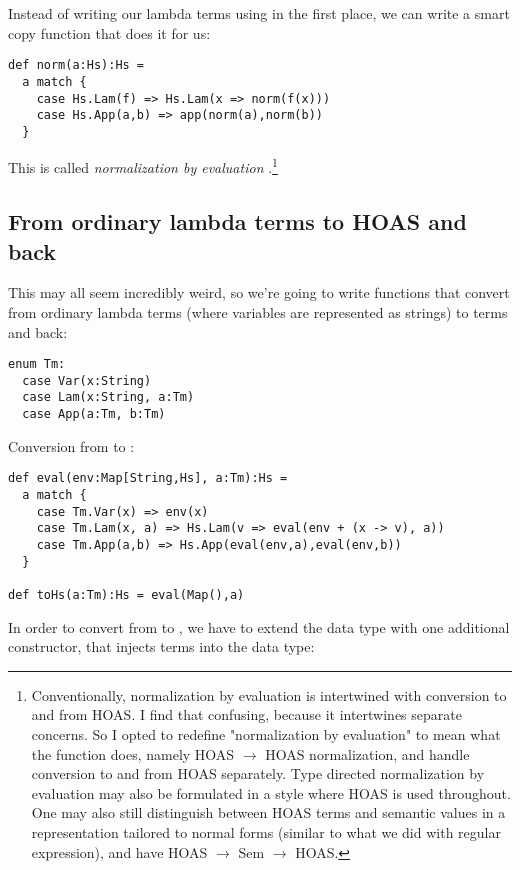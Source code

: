 Instead of writing our lambda terms using  in the first place, we can write a smart copy function that does it for us:

\begin{lstlisting}
def norm(a:Hs):Hs =
  a match {
    case Hs.Lam(f) => Hs.Lam(x => norm(f(x)))
    case Hs.App(a,b) => app(norm(a),norm(b))
  }
\end{lstlisting}

This is called \emph{normalization by evaluation} \cite{berger91}.\footnote{Conventionally, normalization by evaluation is intertwined with conversion to and from HOAS. I find that confusing, because it intertwines separate concerns. So I opted to redefine "normalization by evaluation" to mean what the  function does, namely HOAS $\to$ HOAS normalization, and handle conversion to and from HOAS separately. Type directed normalization by evaluation may also be formulated in a style where HOAS is used throughout. One may also still distinguish between HOAS terms and semantic values in a representation tailored to normal forms (similar to what we did with regular expression), and have HOAS $\to$ Sem $\to$ HOAS.}

\subsection{From ordinary lambda terms to HOAS and back}

This may all seem incredibly weird, so we're going to write functions that convert from ordinary lambda terms (where variables are represented as strings) to  terms and back:

\begin{lstlisting}
enum Tm:
  case Var(x:String)
  case Lam(x:String, a:Tm)
  case App(a:Tm, b:Tm)
\end{lstlisting}

Conversion from  to :

\begin{lstlisting}
def eval(env:Map[String,Hs], a:Tm):Hs =
  a match {
    case Tm.Var(x) => env(x)
    case Tm.Lam(x, a) => Hs.Lam(v => eval(env + (x -> v), a))
    case Tm.App(a,b) => Hs.App(eval(env,a),eval(env,b))
  }

def toHs(a:Tm):Hs = eval(Map(),a)
\end{lstlisting}

In order to convert from  to , we have to extend the  data type with one additional constructor, that injects  terms into the  data type:

